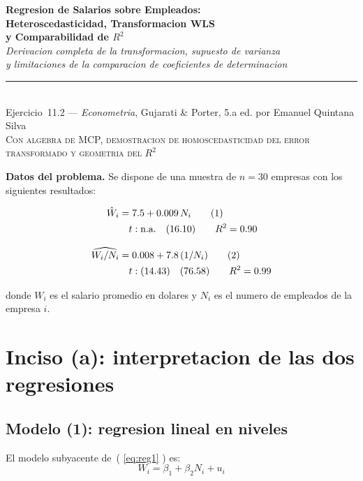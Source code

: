 \documentclass[12pt, letterpaper]{article}
\theoremstyle{remark}
\begin{document}
\begin{center}
  {\LARGE\bfseries Regresion de Salarios sobre Empleados:}\\[6pt]
  {\LARGE\bfseries Heteroscedasticidad, Transformacion WLS}\\[6pt]
  {\LARGE\bfseries y Comparabilidad de $R^2$}\\[12pt]
  {\large\itshape Derivacion completa de la transformacion, supuesto de varianza}\\
  {\large\itshape y limitaciones de la comparacion de coeficientes de determinacion}\\[14pt]
  \rule{0.55\linewidth}{0.6pt}\\[8pt]
  {\normalsize Ejercicio~11.2 --- \textit{Econometria}, Gujarati \& Porter, 5.a ed. por Emanuel Quintana Silva}\\[4pt]
  {\small\textsc{Con algebra de MCP, demostracion de homoscedasticidad del error transformado
  y geometria del $R^2$}}
\end{center}

\vspace{10pt}

\noindent\textbf{Datos del problema.}\quad
Se dispone de una muestra de $n = 30$ empresas con los siguientes resultados:

\begin{align}
  \hat W_i &= 7.5 + 0.009\, N_i
  \tag{1}\label{eq:reg1}\\
  &\quad t: \text{n.a.} \quad (16.10) \qquad R^2 = 0.90 \notag\\[8pt]
  \widehat{W_i/N_i} &= 0.008 + 7.8\,(1/N_i)
  \tag{2}\label{eq:reg2}\\
  &\quad t: (14.43) \quad (76.58) \qquad R^2 = 0.99 \notag
\end{align}

donde $W_i$ es el salario promedio en dolares y $N_i$ es el numero de empleados
de la empresa $i$.

\section{Inciso (a): interpretacion de las dos regresiones}

\subsection{Modelo (1): regresion lineal en niveles}

El modelo subyacente de~( \ref{eq:reg1} ) es:
\begin{equation}
  W_i = \beta_1 + \beta_2 N_i + u_i
  \label{eq:modelo1}
\end{equation}
\end{document}
